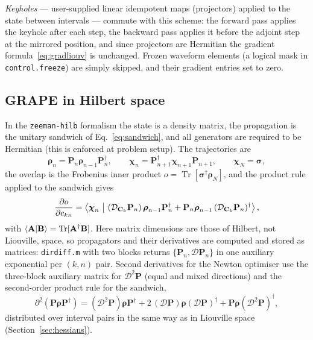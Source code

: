 \documentclass[11pt,a4paper]{article}
\newcommand{\code}[1]{\texttt{#1}}
\newcommand{\Tr}{\operatorname{Tr}}
\begin{document}
\emph{Keyholes} --- user-supplied linear idempotent maps (projectors)
applied to the state between intervals --- commute with this scheme: the
forward pass applies the keyhole after each step, the backward pass
applies it before the adjoint step at the mirrored position, and since
projectors are Hermitian the gradient formula~\eqref{eq:gradliouv} is
unchanged. Frozen waveform elements (a logical mask in
\code{control.freeze}) are simply skipped, and their gradient entries set
to zero.

\subsection{GRAPE in Hilbert space}
\label{sec:grapehilb}

In the \code{zeeman-hilb} formalism the state is a density matrix, the
propagation is the unitary sandwich of Eq.~\eqref{eq:sandwich}, and all
generators are required to be Hermitian (this is enforced at problem
setup). The trajectories are
\begin{equation}
  \boldsymbol{\rho}_{n}
  =\mathbf{P}_n\boldsymbol{\rho}_{n-1}\mathbf{P}_n^{\dagger},
  \qquad
  \boldsymbol{\chi}_{n}
  =\mathbf{P}_{n+1}^{\dagger}\boldsymbol{\chi}_{n+1}\mathbf{P}_{n+1},
  \qquad \boldsymbol{\chi}_{N}=\boldsymbol{\sigma},
\end{equation}
the overlap is the Frobenius inner product
$o=\Tr[\boldsymbol{\sigma}^{\dagger}\boldsymbol{\rho}_N]$, and the product
rule applied to the sandwich gives
\begin{equation}
  \frac{\partial o}{\partial c_{kn}}
  =\Braket{\boldsymbol{\chi}_{n}\,|\,
   (\mathcal{D}_{\mathbf{C}_k}\mathbf{P}_n)\,
   \boldsymbol{\rho}_{n-1}\mathbf{P}_n^{\dagger}
   +\mathbf{P}_n\boldsymbol{\rho}_{n-1}\,
   (\mathcal{D}_{\mathbf{C}_k}\mathbf{P}_n)^{\dagger}},
  \label{eq:gradhilb}
\end{equation}
with $\braket{\mathbf{A}|\mathbf{B}}=\Tr[\mathbf{A}^{\dagger}\mathbf{B}]$.
Here matrix dimensions are those of Hilbert, not Liouville, space, so
propagators and their derivatives are computed and stored as matrices:
\code{dirdiff.m} with two blocks returns $\{\mathbf{P}_n,
\mathcal{D}\mathbf{P}_n\}$ in one auxiliary exponential per $(k,n)$ pair.
Second derivatives for the Newton optimiser use the three-block auxiliary
matrix for $\mathcal{D}^2\mathbf{P}$ (equal and mixed directions) and the
second-order product rule for the sandwich,
\begin{equation}
  \partial^2(\mathbf{P}\boldsymbol{\rho}\mathbf{P}^{\dagger})
  =(\mathcal{D}^2\mathbf{P})\boldsymbol{\rho}\mathbf{P}^{\dagger}
  +2\,(\mathcal{D}\mathbf{P})\boldsymbol{\rho}
      (\mathcal{D}\mathbf{P})^{\dagger}
  +\mathbf{P}\boldsymbol{\rho}(\mathcal{D}^2\mathbf{P})^{\dagger},
\end{equation}
distributed over interval pairs in the same way as in Liouville space
(Section~\ref{sec:hessians}).
\end{document}
